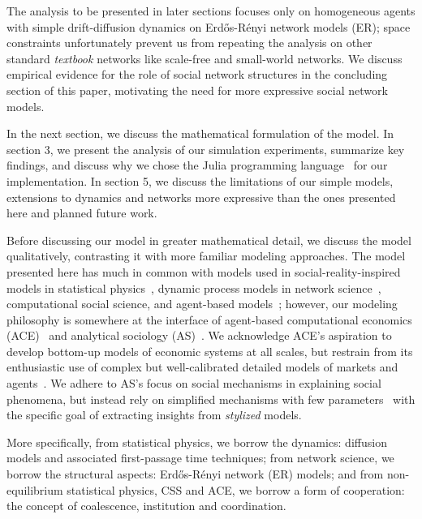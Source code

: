 The analysis to be presented in later sections focuses only on homogeneous agents with simple drift-diffusion dynamics on Erd\H{o}s-R\'{e}nyi network models (ER); space constraints unfortunately prevent us from repeating the analysis on other standard \textit{textbook} networks like scale-free and small-world networks. We discuss empirical evidence for the role of social network structures in the concluding section of this paper, motivating the need for more expressive social network models. 


In the next section, we discuss the mathematical formulation of the model. In section 3, we present the analysis of our simulation experiments, summarize key findings, and discuss why we chose the Julia programming language~\cite{Julia-2017} for our implementation. In section 5, we discuss the limitations of our simple models, extensions to dynamics and networks more expressive than the ones presented here and planned future work. 

Before discussing our model in greater mathematical detail, we discuss the model qualitatively, contrasting it with more familiar modeling approaches. The model presented here has much in common with models used in social-reality-inspired models in statistical physics~\cite{redner2001guide}, dynamic process models in network science~\cite{newman2018networks}, computational social science, and agent-based models~\cite{abm_review}; however, our modeling philosophy is somewhere at the interface of agent-based computational economics (ACE)~\cite{tesfatsion} and analytical sociology (AS)~\cite{ch1as_hdbk,ch2as_hdbk}. We acknowledge ACE's aspiration to develop bottom-up models of economic systems at all scales, but restrain from its enthusiastic use of complex but well-calibrated detailed models of markets and agents~\cite{tesfatsion2017}. We adhere to AS's focus on social mechanisms in explaining social phenomena, but instead rely on simplified mechanisms with few parameters~\cite{ch11as_hdbk} with the specific goal of extracting insights from \textit{stylized} models.       

More specifically, from statistical physics, we borrow the dynamics: diffusion models and associated first-passage time techniques; from network science, we borrow the structural aspects: Erd\H{o}s-R\'{e}nyi network (ER) models; and from non-equilibrium statistical physics, CSS and ACE, we borrow a form of cooperation: the concept of coalescence, institution and coordination. 


